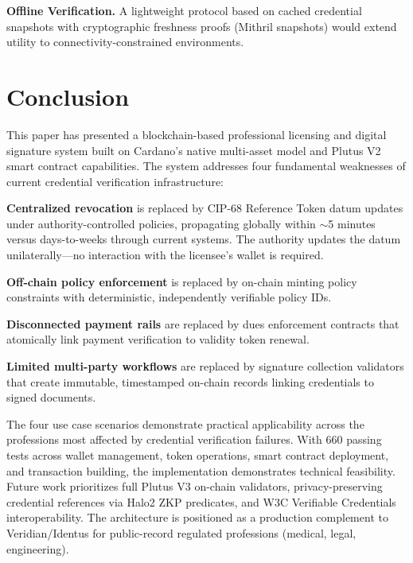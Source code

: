 \documentclass[conference,10pt]{IEEEtran}
\begin{document}
\textbf{Offline Verification.} A lightweight protocol based on cached credential snapshots with cryptographic freshness proofs (Mithril snapshots) would extend utility to connectivity-constrained environments.

\section{Conclusion}
\label{sec:conclusion}

This paper has presented a blockchain-based professional licensing and digital signature system built on Cardano's native multi-asset model and Plutus V2 smart contract capabilities. The system addresses four fundamental weaknesses of current credential verification infrastructure:

\textbf{Centralized revocation} is replaced by CIP-68 Reference Token datum updates under authority-controlled policies, propagating globally within $\sim$5 minutes versus days-to-weeks through current systems. The authority updates the datum unilaterally---no interaction with the licensee's wallet is required.

\textbf{Off-chain policy enforcement} is replaced by on-chain minting policy constraints with deterministic, independently verifiable policy IDs.

\textbf{Disconnected payment rails} are replaced by dues enforcement contracts that atomically link payment verification to validity token renewal.

\textbf{Limited multi-party workflows} are replaced by signature collection validators that create immutable, timestamped on-chain records linking credentials to signed documents.

The four use case scenarios demonstrate practical applicability across the professions most affected by credential verification failures. With 660 passing tests across wallet management, token operations, smart contract deployment, and transaction building, the implementation demonstrates technical feasibility. Future work prioritizes full Plutus V3 on-chain validators, privacy-preserving credential references via Halo2 ZKP predicates, and W3C Verifiable Credentials interoperability. The architecture is positioned as a production complement to Veridian/Identus for public-record regulated professions (medical, legal, engineering).
\end{document}
